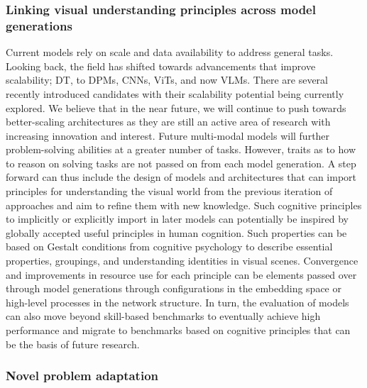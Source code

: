 \subsubsection{Linking visual understanding principles across model generations}

Current models rely on scale and data availability to address general tasks. Looking back, the field has shifted towards advancements that improve scalability; DT, to DPMs, CNNs, ViTs, and now VLMs. There are several recently introduced candidates \citep{dao2022flashattention,gu2023mamba,poli2023hyena} with their scalability potential being currently explored. We believe that in the near future, we will continue to push towards better-scaling architectures as they are still an active area of research with increasing innovation and interest. Future multi-modal models will further problem-solving abilities at a greater number of tasks. However, traits as to how to reason on solving tasks are not passed on from each model generation. A step forward can thus include the design of models and architectures that can import principles for understanding the visual world from the previous iteration of approaches and aim to refine them with new knowledge. Such cognitive principles to implicitly or explicitly import in later models can potentially be inspired by globally accepted useful principles in human cognition. Such properties can be based on Gestalt conditions from cognitive psychology \citep{koffka2013principles,kohler1967gestalt} to describe essential properties, groupings, and understanding identities in visual scenes. Convergence and improvements in resource use for each principle can be elements passed over through model generations through configurations in the embedding space or high-level processes in the network structure. In turn, the evaluation of models can also move beyond skill-based benchmarks to eventually achieve high performance and migrate to benchmarks based on cognitive principles that can be the basis of future research.


\subsubsection{Novel problem adaptation}

